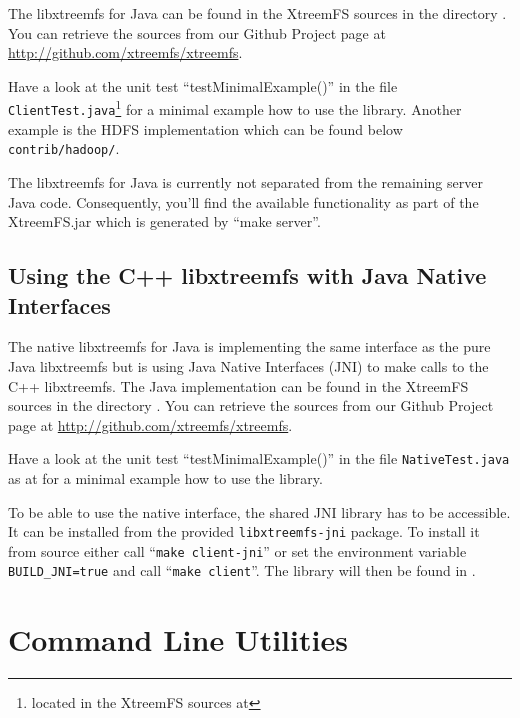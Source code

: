 \documentclass[a4paper,10pt]{book}
\begin{document}
The libxtreemfs for Java can be found in the XtreemFS sources in the directory
. You can retrieve the
sources from our Github Project page at \url{http://github.com/xtreemfs/xtreemfs}.

Have a look at the unit test ``testMinimalExample()'' in the file \texttt{ClientTest.java}\footnote{located in the XtreemFS sources at } for a minimal example how to use the library. Another example is the HDFS implementation which can be found below \texttt{contrib/hadoop/}.

The libxtreemfs for Java is currently not separated from the remaining server Java code. Consequently, you'll find the available functionality as part of the XtreemFS.jar which is generated by ``make server''.


\section{Using the C++ libxtreemfs with Java Native Interfaces}
\label{sec:libjnixtreemfs_for_java}
The native libxtreemfs for Java is implementing the same interface as the pure Java libxtreemfs but is using Java Native Interfaces (JNI) to make calls to the C++ libxtreemfs. The Java implementation can be found in the XtreemFS sources in the directory . You can retrieve the
sources from our Github Project page at \url{http://github.com/xtreemfs/xtreemfs}.

Have a look at the unit test ``testMinimalExample()'' in the file \texttt{NativeTest.java} as  at  for a minimal example how to use the library.

To be able to use the native interface, the shared JNI library has to be accessible. It can be installed from the provided \texttt{libxtreemfs-jni} package. To install it from source either call ``\texttt{make client-jni}'' or set the environment variable \texttt{BUILD\_JNI=true} and call ``\texttt{make client}''. The library will then be found in  .


\chapter{Command Line Utilities}
\label{sec:cli_utils}
\end{document}
